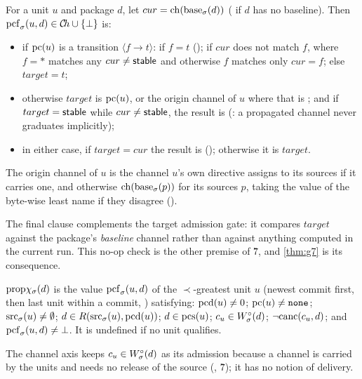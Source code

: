 \begin{definition}
\label{def:propchan}
For a unit $u$ and package $d$, let $cur = \mathrm{ch}(\mathrm{base}_{\sigma}(d))$ (\stable{}
if $d$ has no baseline). Then $\mathrm{pcf}_{\sigma}(u,d) \in \mathcal{C}\!h \cup
\{\bot\}$ is:
\begin{itemize}
  \item if $\mathrm{pc}(u)$ is a transition $\langle f \to t \rangle$: \NONE{} if
    $f = t$ (); \NONE{} if $cur$ does not match $f$, where $f = *$
    matches any $cur \neq \mathsf{stable}$ and otherwise $f$ matches only $cur = f$;
    else $target = t$;
  \item otherwise $target$ is $\mathrm{pc}(u)$, or the origin channel of $u$ where
    that is ; and if $target = \mathsf{stable}$ while $cur \neq \mathsf{stable}$,
    the result is \NONE{} (: a propagated channel never graduates
    implicitly);
  \item in either case, if $target = cur$ the result is \NONE{} ();
    otherwise it is $target$.
\end{itemize}
The origin channel of $u$ is the channel $u$'s own  directive
assigns to its sources if it carries one, and otherwise
$\mathrm{ch}(\mathrm{base}_{\sigma}(p))$ for its sources $p$, taking the value of the
byte-wise least name if they disagree ().
\end{definition}

The final clause complements the target \Winf{} admission gate: it compares
$target$ against the package's \emph{baseline} channel rather than against
anything computed in the current run. This no-op check is the other premise of
\G{7}, and \cref{thm:g7} is its consequence.

\begin{definition}
\label{def:phase1}
$\mathrm{prop}\chi_{\sigma}(d)$ is the value $\mathrm{pcf}_{\sigma}(u,d)$ of the
$\prec$-greatest unit $u$ (newest commit first, then last unit within a commit,
) satisfying: $\mathrm{pcd}(u) \neq 0$; $\mathrm{pc}(u) \neq \texttt{none}$;
$\mathrm{src}_{\sigma}(u) \neq \emptyset$; $d \in R(\mathrm{src}_{\sigma}(u),\mathrm{pcd}(u))$;
$d \in \mathrm{pcs}(u)$; $c_{u} \in W^{\circ}_{\sigma}(d)$; $\lnot\mathrm{canc}(c_{u},d)$; and
$\mathrm{pcf}_{\sigma}(u,d) \neq \bot$. It is undefined if no unit qualifies.
\end{definition}

The channel axis keeps $c_{u} \in W^{\circ}_{\sigma}(d)$ as its admission because a
channel is carried by the units and needs no release of the source
(, \G{7}); it has no notion of delivery.

